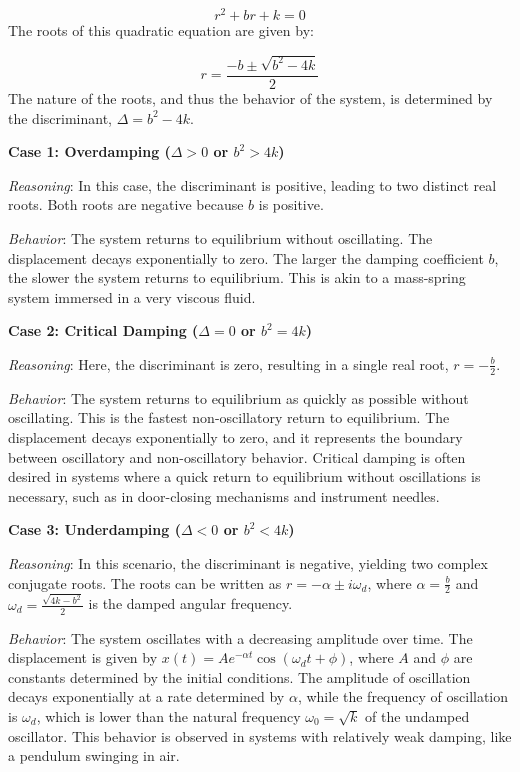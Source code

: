 \documentclass{article}
\begin{document}
\begin{equation*}
r^2 + br + k = 0
\end{equation*}
The roots of this quadratic equation are given by:

\begin{equation*}
r = \frac{-b \pm \sqrt{b^2 - 4k}}{2}
\end{equation*}
The nature of the roots, and thus the behavior of the system, is determined by the discriminant, $\Delta = b^2 - 4k$.

\noindent \textbf{Case 1: Overdamping ($\Delta > 0$ or $b^2 > 4k$)}

\textit{Reasoning}: In this case, the discriminant is positive, leading to two distinct real roots. Both roots are negative because $b$ is positive.

\textit{Behavior}: The system returns to equilibrium without oscillating. The displacement decays exponentially to zero. The larger the damping coefficient $b$, the slower the system returns to equilibrium. This is akin to a mass-spring system immersed in a very viscous fluid.

\noindent \textbf{Case 2: Critical Damping ($\Delta = 0$ or $b^2 = 4k$)}

\textit{Reasoning}: Here, the discriminant is zero, resulting in a single real root, $r = -\frac{b}{2}$.

\textit{Behavior}: The system returns to equilibrium as quickly as possible without oscillating. This is the fastest non-oscillatory return to equilibrium. The displacement decays exponentially to zero, and it represents the boundary between oscillatory and non-oscillatory behavior. Critical damping is often desired in systems where a quick return to equilibrium without oscillations is necessary, such as in door-closing mechanisms and instrument needles.

\noindent \textbf{Case 3: Underdamping ($\Delta < 0$ or $b^2 < 4k$)}

\textit{Reasoning}: In this scenario, the discriminant is negative, yielding two complex conjugate roots. The roots can be written as $r = -\alpha \pm i\omega_d$, where $\alpha = \frac{b}{2}$ and $\omega_d = \frac{\sqrt{4k - b^2}}{2}$ is the damped angular frequency.

\textit{Behavior}: The system oscillates with a decreasing amplitude over time. The displacement is given by $x(t) = Ae^{-\alpha t}\cos(\omega_d t + \phi)$, where $A$ and $\phi$ are constants determined by the initial conditions. The amplitude of oscillation decays exponentially at a rate determined by $\alpha$, while the frequency of oscillation is $\omega_d$, which is lower than the natural frequency $\omega_0 = \sqrt{k}$ of the undamped oscillator. This behavior is observed in systems with relatively weak damping, like a pendulum swinging in air.
\end{document}
